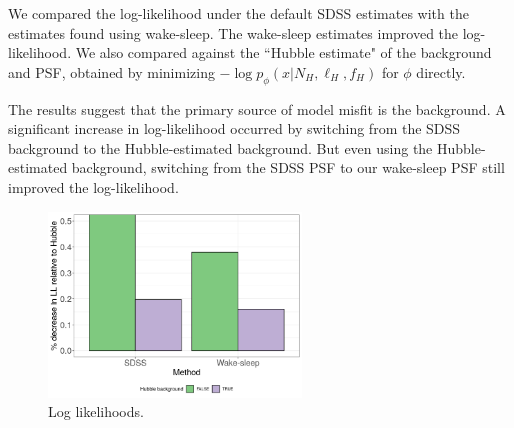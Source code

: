 We compared the log-likelihood under the default SDSS estimates with the estimates found using wake-sleep. The wake-sleep estimates improved the log-likelihood. We also compared against the ``Hubble estimate" of the background and PSF, obtained by minimizing 
$- \log p_\phi(x | N_{H}, \ell_{H}, f_{H})$ for $\phi$ directly. 

The results suggest that the primary source of model misfit is the background. A significant increase in log-likelihood occurred by switching from the SDSS background to the Hubble-estimated background. 
But even using the Hubble-estimated background, switching from the SDSS PSF to our wake-sleep PSF still improved the log-likelihood. 

\begin{figure}[ht]
    \centering
    \includegraphics[width=0.6\textwidth]{figures/loglik_table.png}
    \caption{Log likelihoods. }
    \label{fig:loglik_table}
\end{figure}

% 





